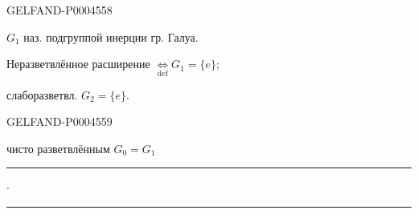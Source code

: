 \begin{GelfandAdjacentEvidence}{GELFAND-P000455}{8}


$G_1$ наз. подгруппой инерции гр. Галуа.

Неразветвлённое расширение $\underset{\mathrm{def}}{\Longleftrightarrow} G_1=\{e\}$;

слаборазветвл. $G_2=\{e\}$.
\end{GelfandAdjacentEvidence}
\begin{GelfandAdjacentEvidence}{GELFAND-P000455}{9}


чисто разветвлённым $G_0=G_1$
\end{GelfandAdjacentEvidence}


\begin{center}
\rule[.5ex]{25mm}{.35pt}\enspace$\cdot$\enspace\rule[.5ex]{35mm}{.35pt}
\end{center}


